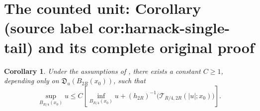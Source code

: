 \documentclass[10pt,a4paper]{amsart}
\newcommand{\calT}{\mathcal T}
\theoremstyle{plain}
\newtheorem{corollary}[theorem]{Corollary}
\theoremstyle{definition}
\theoremstyle{remark}
\begin{document}
\section{The counted unit: Corollary (source label cor:harnack-single-tail) and its complete original proof}

\begin{corollary}\label{cor:harnack-single-tail}
Under the assumptions of , there exists a constant
\(C\ge1\), depending only on \(\mathfrak D_u(B_{2R}(x_0))\), such that
\begin{equation}\label{eq:harnack-single-tail}
    \sup_{B_{R/4}(x_0)}u\le
    C\left[\inf_{B_{R/4}(x_0)}u+(h_{2R})^{-1}\bigl(\calT_{R/4,2R}(|u|;x_0)\bigr)\right].
\end{equation}
\end{corollary}
\end{document}
